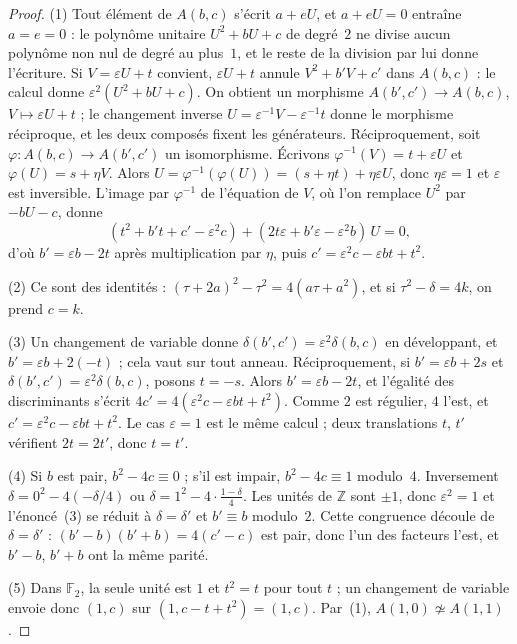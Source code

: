\begin{proof}
(1) Tout élément de $A(b, c)$ s'écrit $a + eU$, et $a + eU = 0$ entraîne $a = e = 0$ : le polynôme unitaire $U^2 + bU + c$ de degré~$2$ ne divise aucun polynôme non nul de degré au plus~$1$, et le reste de la division par lui donne l'écriture. Si $V = \varepsilon U + t$ convient, $\varepsilon U + t$ annule $V^2 + b'V + c'$ dans $A(b, c)$ : le calcul donne $\varepsilon^2(U^2 + bU + c)$. On obtient un morphisme $A(b', c') \to A(b, c)$, $V \mapsto \varepsilon U + t$ ; le changement inverse $U = \varepsilon^{-1}V - \varepsilon^{-1}t$ donne le morphisme réciproque, et les deux composés fixent les générateurs. Réciproquement, soit $\varphi : A(b, c) \to A(b', c')$ un isomorphisme. Écrivons $\varphi^{-1}(V) = t + \varepsilon U$ et $\varphi(U) = s + \eta V$. Alors $U = \varphi^{-1}(\varphi(U)) = (s + \eta t) + \eta\varepsilon U$, donc $\eta\varepsilon = 1$ et $\varepsilon$ est inversible. L'image par $\varphi^{-1}$ de l'équation de $V$, où l'on remplace $U^2$ par $-bU - c$, donne
\[ (t^2 + b't + c' - \varepsilon^2c) + (2t\varepsilon + b'\varepsilon - \varepsilon^2b)\,U = 0, \]
d'où $b' = \varepsilon b - 2t$ après multiplication par $\eta$, puis $c' = \varepsilon^2c - \varepsilon bt + t^2$.

(2) Ce sont des identités : $(\tau + 2a)^2 - \tau^2 = 4(a\tau + a^2)$, et si $\tau^2 - \delta = 4k$, on prend $c = k$.

(3) Un changement de variable donne $\delta(b', c') = \varepsilon^2\delta(b, c)$ en développant, et $b' = \varepsilon b + 2(-t)$ ; cela vaut sur tout anneau. Réciproquement, si $b' = \varepsilon b + 2s$ et $\delta(b', c') = \varepsilon^2\delta(b, c)$, posons $t = -s$. Alors $b' = \varepsilon b - 2t$, et l'égalité des discriminants s'écrit $4c' = 4(\varepsilon^2c - \varepsilon bt + t^2)$. Comme $2$ est régulier, $4$ l'est, et $c' = \varepsilon^2c - \varepsilon bt + t^2$. Le cas $\varepsilon = 1$ est le même calcul ; deux translations $t$, $t'$ vérifient $2t = 2t'$, donc $t = t'$.

(4) Si $b$ est pair, $b^2 - 4c \equiv 0$ ; s'il est impair, $b^2 - 4c \equiv 1$ modulo~$4$. Inversement $\delta = 0^2 - 4(-\delta/4)$ ou $\delta = 1^2 - 4\cdot\frac{1 - \delta}{4}$. Les unités de $\mathbb Z$ sont $\pm 1$, donc $\varepsilon^2 = 1$ et l'énoncé~(3) se réduit à $\delta = \delta'$ et $b' \equiv b$ modulo~$2$. Cette congruence découle de $\delta = \delta'$ : $(b' - b)(b' + b) = 4(c' - c)$ est pair, donc l'un des facteurs l'est, et $b' - b$, $b' + b$ ont la même parité.

(5) Dans $\mathbb F_2$, la seule unité est $1$ et $t^2 = t$ pour tout $t$ ; un changement de variable envoie donc $(1, c)$ sur $(1, c - t + t^2) = (1, c)$. Par~(1), $A(1, 0) \not\simeq A(1, 1)$.
\end{proof}

